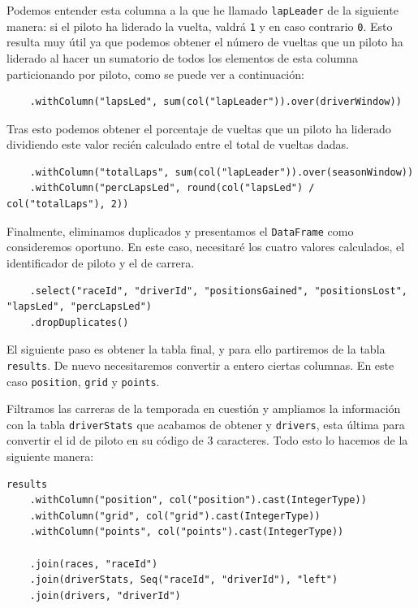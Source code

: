 \documentclass[12pt,twoside,titlepage]{report}
\begin{document}
Podemos entender esta columna a la que he llamado \texttt{lapLeader} de la siguiente manera: si el piloto ha liderado la vuelta, valdrá \texttt{1} y en caso contrario \texttt{0}. Esto resulta muy útil ya que podemos obtener el número de vueltas que un piloto ha liderado al hacer un sumatorio de todos los elementos de esta columna particionando por piloto, como se puede ver a continuación:

\begin{lstlisting}
	.withColumn("lapsLed", sum(col("lapLeader")).over(driverWindow))
\end{lstlisting}

Tras esto podemos obtener el porcentaje de vueltas que un piloto ha liderado dividiendo este valor recién calculado entre el total de vueltas dadas.

\begin{lstlisting}
	.withColumn("totalLaps", sum(col("lapLeader")).over(seasonWindow))
	.withColumn("percLapsLed", round(col("lapsLed") / col("totalLaps"), 2))
\end{lstlisting}

Finalmente, eliminamos duplicados y presentamos el \texttt{DataFrame} como consideremos oportuno. En este caso, necesitaré los cuatro valores calculados, el identificador de piloto y el de carrera.

\begin{lstlisting}
	.select("raceId", "driverId", "positionsGained", "positionsLost", "lapsLed", "percLapsLed")
	.dropDuplicates()
\end{lstlisting}

El siguiente paso es obtener la tabla final, y para ello partiremos de la tabla \texttt{results}. De nuevo necesitaremos convertir a entero ciertas columnas. En este caso \texttt{position}, \texttt{grid} y \texttt{points}.

Filtramos las carreras de la temporada en cuestión y ampliamos la información con la tabla \texttt{driverStats} que acabamos de obtener y \texttt{drivers}, esta última para convertir el id de piloto en su código de 3 caracteres. Todo esto lo hacemos de la siguiente manera:

\begin{lstlisting}
results
	.withColumn("position", col("position").cast(IntegerType))    
	.withColumn("grid", col("grid").cast(IntegerType))    
	.withColumn("points", col("points").cast(IntegerType))
	
	.join(races, "raceId")
	.join(driverStats, Seq("raceId", "driverId"), "left")
	.join(drivers, "driverId")  
\end{lstlisting}
\end{document}
